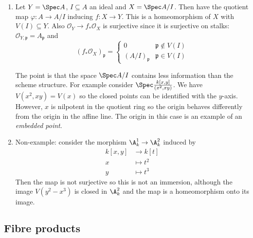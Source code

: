 \documentclass[a4paper]{article}
\newcommand{\sh}[1]{\mathcal{#1}} %
\begin{document}
\begin{eg}\leavevmode
  \begin{enumerate}
  \item Let \(Y = \Spec A\), \(I \subseteq A\) an ideal and \(X = \Spec A/I\). Then have the quotient map \(\varphi: A \to A/I\) inducing \(f: X \to Y\). This is a homeomorphism of \(X\) with \(V(I) \subseteq Y\). Also \(\sh O_Y \to f_* \sh O_X\) is surjective since it is surjective on stalks: \(\sh O_{Y, \mathfrak p} = A_{\mathfrak p}\) and
    \[
      (f_* \sh O_X)_{\mathfrak p} =
      \begin{cases}
        0 & \mathfrak p \notin V(I) \\
        (A/I)_{\mathfrak p} & \mathfrak p \in V(I)
      \end{cases}
    \]

    The point is that the space \(\Spec A/I\) contains less information than the scheme structure. For example consider \(\Spec \frac{k[x, y]}{(x^2, xy)}\). We have \(V(x^2, xy) = V(x)\) so the closed points can be identified with the \(y\)-axis. However, \(x\) is nilpotent in the quotient ring so the origin behaves differently from the origin in the affine line. The origin in this case is an example of an \emph{embedded point}.
  \item Non-example: consider the morphism \(\A_k^1 \to \A_k^2\) induced by
    \begin{align*}
      k[x, y] &\to k[t] \\
      x &\mapsto t^2 \\
      y &\mapsto t^3
    \end{align*}
    Then the map is not surjective so this is not an immersion, although the image \(V(y^2 - x^3)\) is closed in \(\A^2_k\) and the map is a homeomorphism onto its image.
  \end{enumerate}
\end{eg}

\subsection{Fibre products}
\end{document}
